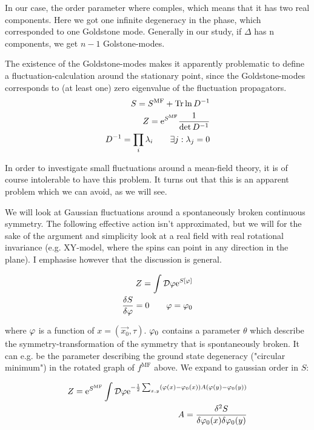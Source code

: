 In our case, the order parameter where comples, which means that it has two real components. Here we got one infinite degeneracy in the phase, which corresponded to one Goldstone mode. Generally in our study, if $\Delta$ has n components, we get $n-1$ Golstone-modes.  

The existence of the Goldstone-modes makes it apparently problematic to define a fluctuation-calculation around the stationary point, since the Goldstone-modes corresponds to (at least one) zero eigenvalue of the fluctuation propagators. 
\begin{align*}
    S = S^{\text{MF}} + \Tr \ln D^{-1} \\ 
    Z = \mathrm{e}^{S^{\text{MF}}}\frac{1}{\det D^{-1}} \\ 
    D^{-1} = \prod_i \lambda_i \quad \quad \exists j : \lambda_j = 0 
\end{align*}

In order to investigate small fluctuations around a mean-field theory, it is of course intolerable to have this problem. It turns out that this is an apparent problem which we can avoid, as we will see. 

We will look at Gaussian fluctuations around a spontaneously broken continuous symmetry. The following effective action isn't approximated, but we will for the sake of the argument and simplicity look at a real field with real rotational invariance (e.g. XY-model, where the spins can point in any direction in the plane). I emphasise however that the discussion is general. 

\begin{align*}
    Z = \int \D \p \e^{S[\p]} \\ 
    \fdv{S}{\p} = 0 \quad \quad  \p = \p_0
\end{align*}

where $\varphi$ is a function of $x = (\Vec{x_0}, \tau)$. $\varphi_0$ contains a parameter $\theta$ which describe the symmetry-transformation of the symmetry that is spontaneously broken. It can e.g. be the parameter describing the ground state degeneracy ("circular minimum") in the rotated graph of $f^{\text{MF}}$ above. We expand to gaussian order in $S$:

\begin{align*}
    Z = \e^{S^{\text{MF}}}\int \D \p \e^{-\frac{1}{2}\sum_{x,y} (\p(x) - \p_0(x)) A (\p(y) - \p_0(y))} \\
    A = \fdv{^2S}{\p_0(x) \delta \p_0(y)}
\end{align*}

